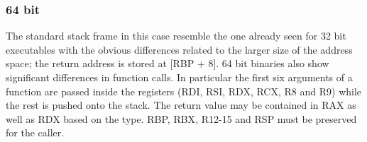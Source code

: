 \subsubsection{64 bit}
The standard stack frame in this case resemble the one already seen for 32 bit executables with the obvious differences
related to the larger size of the address space; the return address is stored at [{\ttfamily RBP + 8}]. 64 bit binaries
also show significant differences in function calls.
In particular the first six arguments of a function are passed inside the registers ({\ttfamily RDI}, {\ttfamily RSI},
{\ttfamily RDX}, {\ttfamily RCX}, {\ttfamily R8} and {\ttfamily R9}) while the rest is pushed onto the stack. The return
value may be contained in {\ttfamily RAX} as well as {\ttfamily RDX} based on the type. {\ttfamily RBP}, {\ttfamily
RBX}, {\ttfamily R12-15} and {\ttfamily RSP} must be preserved for the caller.
